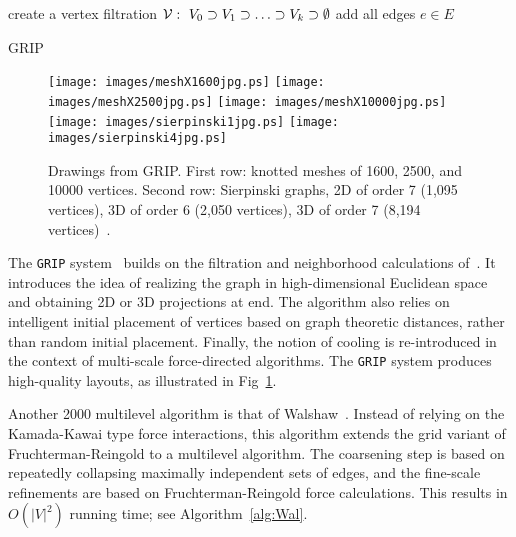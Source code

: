 \documentclass[notitlepage,letter,11pt]{article}
\begin{document}
\begin{algorithm}
create a vertex filtration ${\cal V}:\ V_0 \supset V_1 \supset \ldots \supset V_k \supset \emptyset$\;
add all edges $e \in E$\;
\caption{GRIP \label{alg:main}}
\end{algorithm}



\begin{figure}[t]
\begin{center}
\texttt{[image: images/meshX1600jpg.ps]}
\texttt{[image: images/meshX2500jpg.ps]}
\texttt{[image: images/meshX10000jpg.ps]}\\
\texttt{[image: images/sierpinski1jpg.ps]}
\texttt{[image: images/sierpinski4jpg.ps]}
\end{center}
\caption{\small\sf Drawings from GRIP. First row: knotted
  meshes of 1600, 2500, and 10000 vertices. Second row: Sierpinski graphs, 2D of order 7
(1,095 vertices), 3D of order 6 (2,050 vertices), 3D of order 7 (8,194 vertices)~\cite{gk-grip-00}.}
  \label{fd:fig:grip}
\end{figure}
The {\tt GRIP} system~\cite{gk-grip-00} builds on the filtration and neighborhood calculations
of~\cite{ggk-afmda-00j}. It introduces the idea of realizing the graph in
high-dimensional Euclidean space and obtaining 2D or 3D projections at
end. The algorithm also relies on intelligent initial placement of
vertices based on graph theoretic distances, rather than random
initial placement. Finally, the notion of cooling is re-introduced in
the context of multi-scale force-directed algorithms.  The {\tt GRIP}
system produces high-quality layouts, as illustrated in Fig~\ref{fd:fig:grip}.





Another 2000 multilevel algorithm is that
of Walshaw~\cite{w-mafdgd-j-03}. Instead of relying on the
Kamada-Kawai type force interactions, this algorithm extends the grid
variant of Fruchterman-Reingold to a  multilevel algorithm. The
coarsening step is based on repeatedly collapsing maximally
independent sets of edges, and the fine-scale refinements are based on
Fruchterman-Reingold force calculations. This results in $O(|V|^2)$ running time;  see Algorithm~\ref{alg:Wal}.
\end{document}
